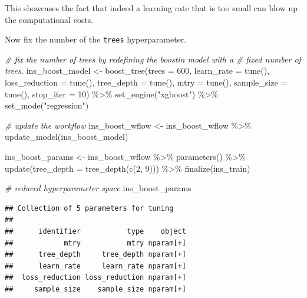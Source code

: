 \documentclass[
]{book}
\newenvironment{Shaded}{\begin{snugshade}}{\end{snugshade}}
\newcommand{\AttributeTok}[1]{\textcolor[rgb]{0.77,0.63,0.00}{#1}}
\newcommand{\CommentTok}[1]{\textcolor[rgb]{0.56,0.35,0.01}{\textit{#1}}}
\newcommand{\DecValTok}[1]{\textcolor[rgb]{0.00,0.00,0.81}{#1}}
\newcommand{\FunctionTok}[1]{\textcolor[rgb]{0.00,0.00,0.00}{#1}}
\newcommand{\NormalTok}[1]{#1}
\newcommand{\OtherTok}[1]{\textcolor[rgb]{0.56,0.35,0.01}{#1}}
\newcommand{\SpecialCharTok}[1]{\textcolor[rgb]{0.00,0.00,0.00}{#1}}
\newcommand{\StringTok}[1]{\textcolor[rgb]{0.31,0.60,0.02}{#1}}
\begin{document}
This showcases the fact that indeed a learning rate that is too small can blow up the computational costs.

Now fix the number of the \texttt{trees} hyperparameter.

\begin{Shaded}
\begin{Highlighting}[]
\CommentTok{\# fix the number of trees by redefining the boostin model with a }
\CommentTok{\# fixed number of trees.}
\NormalTok{ins\_boost\_model }\OtherTok{\textless{}{-}} \FunctionTok{boost\_tree}\NormalTok{(}\AttributeTok{trees =} \DecValTok{600}\NormalTok{,}
                               \AttributeTok{learn\_rate =} \FunctionTok{tune}\NormalTok{(),}
                               \AttributeTok{loss\_reduction =} \FunctionTok{tune}\NormalTok{(),}
                               \AttributeTok{tree\_depth =} \FunctionTok{tune}\NormalTok{(),}
                               \AttributeTok{mtry =} \FunctionTok{tune}\NormalTok{(),}
                               \AttributeTok{sample\_size =} \FunctionTok{tune}\NormalTok{(),}
                               \AttributeTok{stop\_iter =} \DecValTok{10}\NormalTok{) }\SpecialCharTok{\%\textgreater{}\%}
  \FunctionTok{set\_engine}\NormalTok{(}\StringTok{"xgboost"}\NormalTok{) }\SpecialCharTok{\%\textgreater{}\%} 
  \FunctionTok{set\_mode}\NormalTok{(}\StringTok{"regression"}\NormalTok{)}

\CommentTok{\# update the workflow}
\NormalTok{ins\_boost\_wflow }\OtherTok{\textless{}{-}}
\NormalTok{  ins\_boost\_wflow }\SpecialCharTok{\%\textgreater{}\%}
  \FunctionTok{update\_model}\NormalTok{(ins\_boost\_model)}

\NormalTok{ins\_boost\_params }\OtherTok{\textless{}{-}}\NormalTok{ ins\_boost\_wflow }\SpecialCharTok{\%\textgreater{}\%}
  \FunctionTok{parameters}\NormalTok{() }\SpecialCharTok{\%\textgreater{}\%}
  \FunctionTok{update}\NormalTok{(}\AttributeTok{tree\_depth =} \FunctionTok{tree\_depth}\NormalTok{(}\FunctionTok{c}\NormalTok{(}\DecValTok{2}\NormalTok{, }\DecValTok{9}\NormalTok{))) }\SpecialCharTok{\%\textgreater{}\%}
  \FunctionTok{finalize}\NormalTok{(ins\_train)}

\CommentTok{\# reduced hyperparameter space}
\NormalTok{ins\_boost\_params}
\end{Highlighting}
\end{Shaded}

\begin{verbatim}
## Collection of 5 parameters for tuning
## 
##      identifier           type    object
##            mtry           mtry nparam[+]
##      tree_depth     tree_depth nparam[+]
##      learn_rate     learn_rate nparam[+]
##  loss_reduction loss_reduction nparam[+]
##     sample_size    sample_size nparam[+]
\end{verbatim}
\end{document}
